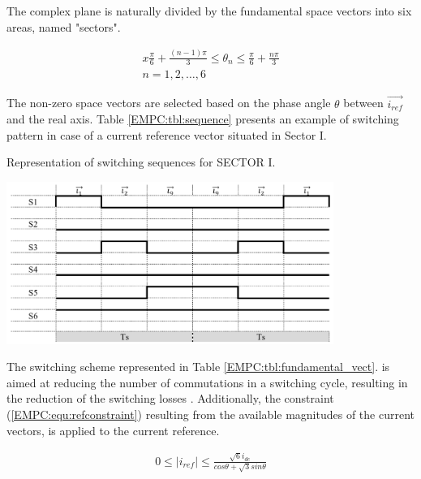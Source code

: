     The complex plane is naturally divided by the fundamental space vectors into six areas, named "sectors".

    \begin{equation}
        \begin{array}{l}
            x\frac{\pi}{6}+\frac{(n-1)\pi}{3}\leq\theta_n\leq\frac{\pi}{6}+\frac{n\pi}{3}\\
            n=1,2,\dots,6
        \end{array}
        \label{EMPC:equ:angle}
    \end{equation}

    The non-zero space vectors are selected based on the phase angle $\theta$ between $\overrightarrow{i_{ref}}$ and the real axis.
    Table \ref{EMPC:tbl:sequence} presents an example of switching pattern in case of a current reference vector situated in Sector I.

    \begin{table}[]

		\caption{Representation of switching sequences for SECTOR I.}
		\centering
        \includegraphics[width=0.8\textwidth]{EMPC_PNG_Pics/Sequence.png}

        \label{EMPC:tbl:sequence}
    \end{table}

    The switching scheme represented in Table \ref{EMPC:tbl:fundamental_vect}. is aimed at reducing the number of commutations in a switching cycle, resulting in the reduction of the switching losses \cite{moussaoui2005open}.
    Additionally, the constraint (\ref{EMPC:equ:refconstraint}) resulting from the available magnitudes of the current vectors, is applied to the current reference.

    \begin{equation}
        \begin{array}{l}
            0\leq|i_{ref}|\leq\frac{\sqrt{6}i_{dc}}{cos\theta+\sqrt{3}sin\theta}
        \end{array}
        \label{EMPC:equ:refconstraint}
    \end{equation}

